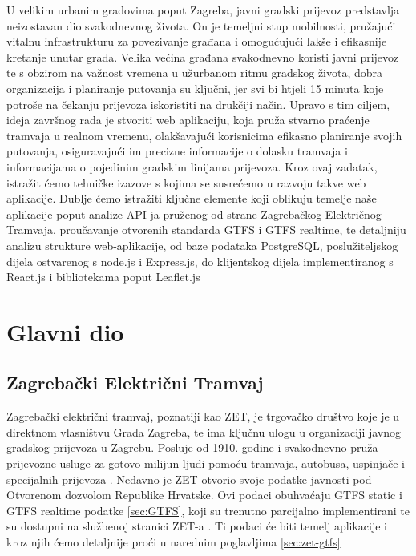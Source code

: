 \documentclass[zavrsnirad]{fer}
\begin{document}
U velikim urbanim gradovima poput Zagreba, javni gradski prijevoz predstavlja neizostavan dio svakodnevnog života. On je temeljni stup mobilnosti, pružajući vitalnu infrastrukturu za povezivanje građana i omogućujući lakše i efikasnije kretanje unutar grada. Velika većina građana svakodnevno koristi javni prijevoz te s obzirom na važnost vremena u užurbanom ritmu gradskog života, dobra organizacija i planiranje putovanja su ključni, jer svi bi htjeli 15 minuta koje potroše na čekanju prijevoza iskoristiti na drukčiji način. Upravo s tim ciljem, ideja završnog rada je stvoriti web aplikaciju, koja pruža stvarno praćenje tramvaja u realnom vremenu, olakšavajući korisnicima efikasno planiranje svojih putovanja, osiguravajući im precizne informacije o dolasku tramvaja i informacijama o pojedinim gradskim linijama prijevoza. Kroz ovaj zadatak, istražit ćemo tehničke izazove s kojima se susrećemo u razvoju takve web aplikacije. Dublje ćemo istražiti ključne elemente koji oblikuju temelje naše aplikacije poput analize API-ja pruženog od strane Zagrebačkog Električnog Tramvaja, proučavanje otvorenih standarda GTFS i GTFS realtime, te detaljniju analizu strukture web-aplikacije, od baze podataka PostgreSQL, poslužiteljskog dijela ostvarenog s node.js i Express.js, do klijentskog dijela implementiranog s React.js i bibliotekama poput Leaflet.js







\chapter{Glavni dio}
\label{pog:glavni_dio}

\section{Zagrebački Električni Tramvaj}

Zagrebački električni tramvaj, poznatiji kao ZET, je trgovačko društvo koje je u direktnom
vlasništvu Grada Zagreba, te ima ključnu ulogu u organizaciji javnog gradskog prijevoza u Zagrebu.
Posluje od 1910. godine i svakodnevno pruža prijevozne usluge za gotovo milijun ljudi pomoću
tramvaja, autobusa, uspinjače i specijalnih prijevoza \cite{ZET}.
Nedavno je ZET otvorio svoje podatke javnosti pod Otvorenom dozvolom Republike Hrvatske. Ovi podaci obuhvaćaju GTFS static i GTFS realtime podatke \ref{sec:GTFS}, koji su trenutno parcijalno implementirani te su dostupni na službenoj stranici ZET-a \cite{ZET-GTFS}.
Ti podaci će biti temelj aplikacije i kroz njih ćemo detaljnije proći u narednim poglavljima \ref{sec:zet-gtfs}
\end{document}
